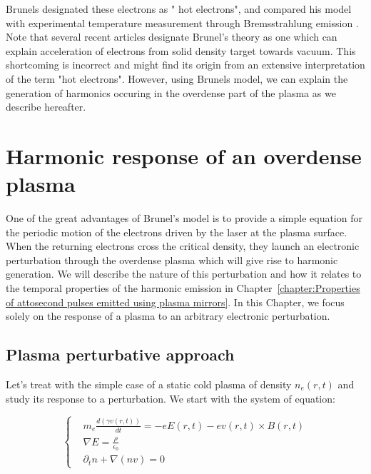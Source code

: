 \noindent Brunels designated these electrons as " hot electrons", and compared his model with experimental temperature measurement through Bremsstrahlung emission \cite{bach1983intensity,priedhorsky1981hard,enright1979superthermal}.
Note that several recent articles designate Brunel's theory as one which can explain acceleration of electrons from solid density target towards vacuum. This shortcoming is incorrect and might find its origin from an extensive interpretation of the term "hot electrons".
However, using Brunels model, we can explain the generation of harmonics occuring in the overdense part of the plasma as we describe hereafter.




\section{Harmonic response of an overdense plasma}
\label{section:Harmonic plasma response to Brunel electrons}

One of the great advantages of Brunel's model is to provide a simple equation for the periodic motion of the electrons driven by the laser at the plasma surface. When the returning electrons cross the critical density, they launch an electronic perturbation through the overdense plasma \cite{TheseCedric,TheseArnaud,Thaury2007} which will give rise to harmonic generation. We will describe the nature of this perturbation and how it relates to the temporal properties of the harmonic emission in Chapter~\ref{chapter:Properties of attosecond pulses emitted using plasma mirrors}. In this Chapter, we focus solely on the response of a plasma to an arbitrary electronic perturbation.



\subsection{Plasma perturbative approach}
\label{subsection:Plasma perturbative approach}

Let's treat with the simple case of a static cold plasma of density $n_e(r,t)$ and study its response to a perturbation. We start with the system of equation:

\begin{equation}
  \left\{
      \begin{aligned}
     &m_e \frac{d(\gamma v(r,t))}{dt} = -e E(r,t) - e v(r,t)\times B(r,t) \\
     &\nabla E =  \frac{\rho}{\epsilon_0}\\
    & \partial_t n + \nabla(nv) = 0
      \end{aligned}
    \right.
\label{eq:PlasmonEquation}
\end{equation}




